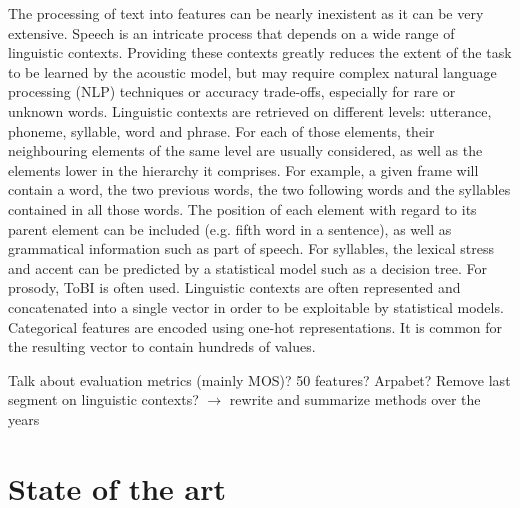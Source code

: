 \documentclass[a4paper, oneside]{article}
\begin{document}
The processing of text into features can be nearly inexistent as it can be very extensive. Speech is an intricate process that depends on a wide range of linguistic contexts. Providing these contexts greatly reduces the extent of the task to be learned by the acoustic model, but may require complex natural language processing (NLP) techniques or accuracy trade-offs, especially for rare or unknown words. Linguistic contexts are retrieved on different levels: utterance, phoneme, syllable, word and phrase. For each of those elements, their neighbouring elements of the same level are usually considered, as well as the elements lower in the hierarchy it comprises. For example, a given frame will contain a word, the two previous words, the two following words and the syllables contained in all those words. The position of each element with regard to its parent element can be included (e.g. fifth word in a sentence), as well as grammatical information such as part of speech. For syllables, the lexical stress and accent can be predicted by a statistical model such as a decision tree. For prosody, ToBI \citep{TOBI} is often used. Linguistic contexts are often represented and concatenated into a single vector in order to be exploitable by statistical models. Categorical features are encoded using one-hot representations. It is common for the resulting vector to contain hundreds of values.

\color{red}Talk about evaluation metrics (mainly MOS)? 50 features? Arpabet? Remove last segment on linguistic contexts? $\rightarrow$ rewrite and summarize methods over the years\color{black}

\section{State of the art}
\end{document}
